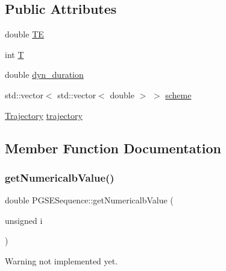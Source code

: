 \subsection*{Public Attributes}
\begin{DoxyCompactItemize}
\item 
double \hyperlink{class_p_g_s_e_sequence_a06df939859fd2ed6104bfee584f893a1}{TE}
\item 
int \hyperlink{class_p_g_s_e_sequence_a07e27e6e8a8506521386a291d62e8423}{T}
\item 
double \hyperlink{class_p_g_s_e_sequence_a0c7e884c3b71cbcc04d6cb2d5f2a5eb9}{dyn\+\_\+duration}
\item 
std\+::vector$<$ std\+::vector$<$ double $>$ $>$ \hyperlink{class_p_g_s_e_sequence_a7349d86720a34e75eaf578fdfd3caeeb}{scheme}
\item 
\hyperlink{class_trajectory}{Trajectory} \hyperlink{class_p_g_s_e_sequence_a0fd0fb458384bfb65070fdab5165dde5}{trajectory}
\end{DoxyCompactItemize}


\subsection{Member Function Documentation}
\mbox{\label{class_p_g_s_e_sequence_a1373f02bffedb1e934818ae8d4fb8939}} 
\subsubsection{\texorpdfstring{get\+Numericalb\+Value()}{getNumericalbValue()}}
{\footnotesize\ttfamily double P\+G\+S\+E\+Sequence\+::get\+Numericalb\+Value (\begin{DoxyParamCaption}\item[{unsigned}]{i }\end{DoxyParamCaption})}

\begin{DoxyWarning}{Warning}
not implemented yet. 
\end{DoxyWarning}
\mbox{\label{class_p_g_s_e_sequence_a6914efd208eab28a1ee6a3f28ca65478}} 

